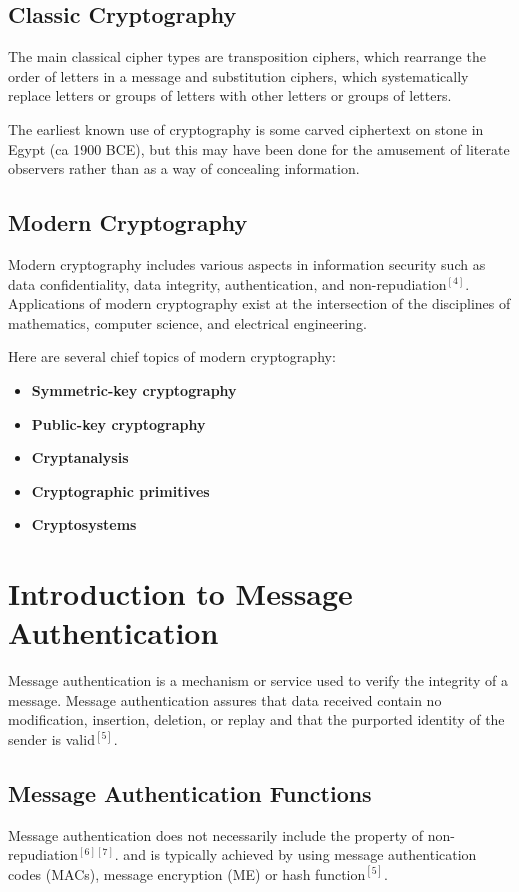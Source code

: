 \documentclass[12pt,a4paper,oneside]{report}
\begin{document}
\subsection{Classic Cryptography}
The main classical cipher types are transposition ciphers, which rearrange the order of letters in a message and substitution ciphers, which systematically replace letters or groups of letters with other letters or groups of letters. 

The earliest known use of cryptography is some carved ciphertext on stone in Egypt (ca 1900 BCE), but this may have been done for the amusement of literate observers rather than as a way of concealing information.

\subsection{Modern Cryptography}
Modern cryptography includes various aspects in information security such as data confidentiality, data integrity, authentication, and non-repudiation$^{[4]}$. Applications of modern cryptography exist at the intersection of the disciplines of mathematics, computer science, and electrical engineering.

Here are several chief topics of modern cryptography:

\begin{itemize}
    \item \textbf{Symmetric-key cryptography}
    \item \textbf{Public-key cryptography}
    \item \textbf{Cryptanalysis}
    \item \textbf{Cryptographic primitives}
    \item \textbf{Cryptosystems}
\end{itemize}

\section{Introduction to Message Authentication}
Message authentication is a mechanism or service used to verify the integrity of a message. Message authentication assures that data received contain no modification, insertion, deletion, or replay and that the purported identity of the sender is valid$^{[5]}$.



\subsection{Message Authentication Functions}
Message authentication does not necessarily include the property of non-repudiation$^{[6][7]}$. and is typically achieved by using message authentication codes (MACs), message encryption (ME) or hash function$^{[5]}$.
\end{document}

